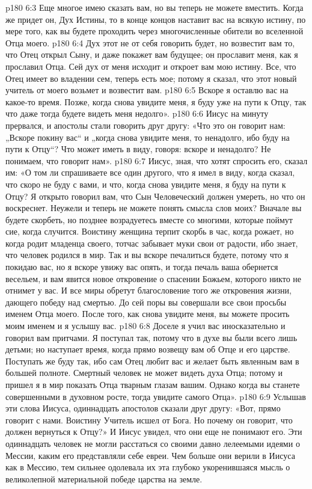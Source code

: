 \vs p180 6:3 Еще многое имею сказать вам, но вы теперь не можете вместить. Когда же придет он, Дух Истины, то в конце концов наставит вас на всякую истину, по мере того, как вы будете проходить через многочисленные обители во вселенной Отца моего.
\vs p180 6:4 Дух этот не от себя говорить будет, но возвестит вам то, что Отец открыл Сыну, и даже покажет вам будущее; он прославит меня, как я прославил Отца. Сей дух от меня исходит и откроет вам мою истину. Все, что Отец имеет во владении сем, теперь есть мое; потому я сказал, что этот новый учитель от моего возьмет и возвестит вам.
\vs p180 6:5 Вскоре я оставлю вас на какое\hyp{}то время. Позже, когда снова увидите меня, я буду уже на пути к Отцу, так что даже тогда будете видеть меня недолго».
\vs p180 6:6 Иисус на минуту прервался, и апостолы стали говорить друг другу: «Что это он говорит нам: „Вскоре покину вас“ и „когда снова увидите меня, то ненадолго, ибо буду на пути к Отцу“? Что может иметь в виду, говоря: вскоре и ненадолго? Не понимаем, что говорит нам».
\vs p180 6:7 Иисус, зная, что хотят спросить его, сказал им: «О том ли спрашиваете все один другого, что я имел в виду, когда сказал, что скоро не буду с вами, и что, когда снова увидите меня, я буду на пути к Отцу? Я открыто говорил вам, что Сын Человеческий должен умереть, но что он воскреснет. Неужели и теперь не можете понять смысла слов моих? Вначале вы будете скорбеть, но позднее возрадуетесь вместе со многими, которые поймут сие, когда случится. Воистину женщина терпит скорбь в час, когда рожает, но когда родит младенца своего, тотчас забывает муки свои от радости, ибо знает, что человек родился в мир. Так и вы вскоре печалиться будете, потому что я покидаю вас, но я вскоре увижу вас опять, и тогда печаль ваша обернется весельем, и вам явится новое откровение о спасении Божьем, которого никто не отнимет у вас. И все миры обретут благословение того же откровения жизни, дающего победу над смертью. До сей поры вы совершали все свои просьбы именем Отца моего. После того, как снова увидите меня, вы можете просить моим именем и я услышу вас.
\vs p180 6:8 Доселе я учил вас иносказательно и говорил вам притчами. Я поступал так, потому что в духе вы были всего лишь детьми; но наступает время, когда прямо возвещу вам об Отце и его царстве. Поступать же буду так, ибо сам Отец любит вас и желает быть явленным вам в большей полноте. Смертный человек не может видеть духа Отца; потому и пришел я в мир показать Отца тварным глазам вашим. Однако когда вы станете совершенными в духовном росте, тогда увидите самого Отца».
\vs p180 6:9 Услышав эти слова Иисуса, одиннадцать апостолов сказали друг другу: «Вот, прямо говорит с нами. Воистину Учитель исшел от Бога. Но почему он говорит, что должен вернуться к Отцу?» И Иисус увидел, что они еще не понимают его. Эти одиннадцать человек не могли расстаться со своими давно лелеемыми идеями о Мессии, каким его представляли себе евреи. Чем больше они верили в Иисуса как в Мессию, тем сильнее одолевала их эта глубоко укоренившаяся мысль о великолепной материальной победе царства на земле.

